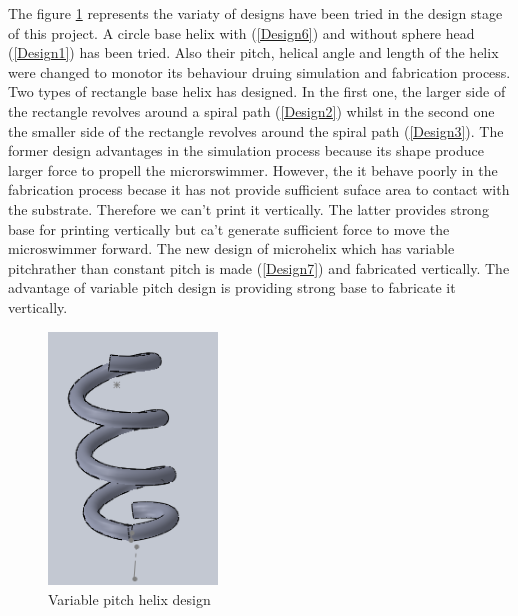 \documentclass[12pt,a4paper,titlepage]{report}
\begin{document}
\begin{figure}
        \caption[Different helical designs]{}\label{Different helical designs}

       

\end{figure}

The figure \ref{Different helical designs} represents the
variaty of designs have been tried in the design stage of this project. A circle base helix with (\ref{Design6}) 
and without sphere head (\ref{Design1}) has been tried. Also their pitch, helical angle and length of the helix
were changed to monotor its behaviour druing simulation and fabrication process. Two types of
 rectangle base helix has designed. In the first one, the larger side of the rectangle revolves around a spiral path (\ref{Design2})
whilst in the second one the smaller side of the rectangle revolves around the spiral path (\ref{Design3}).
The former design advantages in the simulation process because its shape produce larger force to propell the microrswimmer.
However, the it behave poorly in the fabrication process becase it has not provide sufficient suface area to contact with the 
substrate. Therefore we can\rq{}t print it vertically. The latter provides strong base for printing vertically but ca\rq{}t generate 
sufficient force to move the microswimmer forward. The new design of microhelix which has
variable pitchrather than constant pitch is made (\ref{Design7}) and fabricated vertically. The advantage of variable pitch design 
is providing strong base to fabricate it vertically. 

\begin{figure}
  \begin{center}
    \includegraphics[width=0.4\textwidth]{Design7}
  \caption[Variable pitch helix design]{Variable pitch helix design}
  \label{Variable pitch helix design}
\end{center}
\end{figure}
\end{document}
